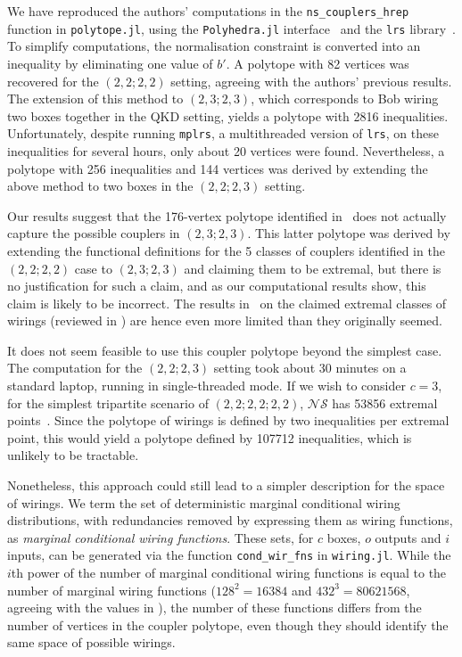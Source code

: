 \documentclass[10pt, a4paper]{article}
\numberwithin{equation}{section} %
\theoremstyle{definition}
\theoremstyle{plain}
\newcommand{\?}{\mathrel{?}} %
\newcommand{\NSs}{\mathcal{NS}}
\begin{document}
                  We have reproduced the authors' computations in the \verb`ns_couplers_hrep` function in \verb`polytope.jl`, using the \verb`Polyhedra.jl` interface~\cite{Polyhedra} and the \verb`lrs` library~\cite{LRS}. To simplify computations, the normalisation constraint is converted into an inequality by eliminating one value of \(b'\). A polytope with 82 vertices was recovered for the \((2,2;2,2)\) setting, agreeing with the authors' previous results. The extension of this method to \((2,3;2,3)\), which corresponds to Bob wiring two boxes together in the QKD setting, yields a polytope with 2816 inequalities. Unfortunately, despite running \verb`mplrs`, a multithreaded version of \verb`lrs`, on these inequalities for several hours, only about 20 vertices were found. Nevertheless, a polytope with 256 inequalities and 144 vertices was derived by extending the above method to two boxes in the \((2,2;2,3)\) setting.

                  Our results suggest that the 176-vertex polytope identified in~\cite[Sec. 7.1]{JanLiThesis} does not actually capture the possible couplers in \((2,3;2,3)\). This latter polytope was derived by extending the functional definitions for the 5 classes of couplers identified in the \((2,2;2,2)\) case to \((2,3;2,3)\) and claiming them to be extremal, but there is no justification for such a claim, and as our computational results show, this claim is likely to be incorrect. The results in~\cite{JanLiThesis} on the claimed extremal classes of wirings (reviewed in ) are hence even more limited than they originally seemed.

                  It does not seem feasible to use this coupler polytope beyond the simplest case. The computation for the \((2,2;2,3)\) setting took about 30 minutes on a standard laptop, running in single-threaded mode. If we wish to consider \(c=3\), for the simplest tripartite scenario of \((2,2; 2,2; 2,2)\), \(\NSs\) has 53856 extremal points~\cite{Tripartite}. Since the polytope of wirings is defined by two inequalities per extremal point, this would yield a polytope defined by 107712 inequalities, which is unlikely to be tractable.


                  Nonetheless, this approach could still lead to a simpler description for the space of wirings. We term the set of deterministic marginal conditional wiring distributions, with redundancies removed by expressing them as wiring functions, as \emph{marginal conditional wiring functions}. These sets, for \(c\) boxes, \(o\) outputs and \(i\) inputs, can be generated via the function \verb`cond_wir_fns` in \verb`wiring.jl`. While the \(i\)th power of the number of marginal conditional wiring functions is equal to the number of marginal wiring functions (\(128^2 = 16384\) and \(432^3 = 80621568\), agreeing with the values in ), the number of these functions differs from the number of vertices in the coupler polytope, even though they should identify the same space of possible wirings.
\end{document}

